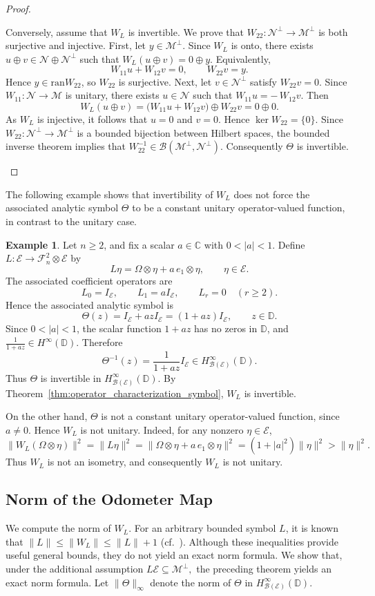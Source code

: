 \documentclass[12pt]{amsart}
\theoremstyle{definition}
\newtheorem{example}[theorem]{Example}
\theoremstyle{remark}
\def \D{\mathbb{D}}
\def \C{\mathbb{C}}
\newcommand{\clb}{\mathcal{B}}
\newcommand{\cle}{\mathcal{E}}
\newcommand{\clm}{\mathcal{M}}
\newcommand{\cln}{\mathcal{N}}
\newcommand{\clf}{\mathcal{F}}
\newcommand{\ran}{\mathrm{ran}}
\numberwithin{equation}{section}
\begin{document}
\begin{proof}
\begin{enumerate}
Conversely, assume that $W_L$ is invertible. We prove that $W_{22}:\cln^{\perp} \to \clm^{\perp}$ is both surjective and injective.
First, let $y\in \clm^\perp$. Since $W_L$ is onto, there exists $u\oplus v\in \cln\oplus \cln^\perp$ such that $W_L(u\oplus v)=0\oplus y.$
Equivalently,
\[
W_{11}u+W_{12}v=0, \qquad W_{22}v=y.
\]
Hence $y\in \ran W_{22}$, so $W_{22}$ is surjective.
Next, let $v\in \cln^\perp$ satisfy $W_{22}v=0$. Since $W_{11}:\cln\to \clm$ is unitary, there exists $u\in \cln$ such that $W_{11}u=-\,W_{12}v.$
Then
\[
W_L(u\oplus v)=\big(W_{11}u+W_{12}v\big)\oplus W_{22}v=0\oplus 0.
\]
As $W_L$ is injective, it follows that $u=0$ and $v=0$. Hence $\ker W_{22}=\{0\}$. Since $W_{22}: \cln^\perp \to \clm^\perp$ is a bounded bijection between Hilbert spaces, the bounded inverse theorem implies that \(W_{22}^{-1}\in \clb(\clm^\perp,\cln^\perp)\).
Consequently $\Theta$ is invertible. 
\end{enumerate}
\end{proof}

The following example shows that invertibility of \(W_L\) does not force the
associated analytic symbol \(\Theta\) to be a constant unitary
operator-valued function, in contrast to the unitary case. 

\begin{example}
 Let \(n\geq2\),
and fix a scalar \(a\in\C\) with \(0<|a|<1\). Define
\(L:\cle\to \clf_n^2\otimes\cle\) by
\[
L\eta=\Omega\otimes\eta+a\,e_1\otimes\eta,
\qquad \eta\in\cle.
\]
The associated coefficient operators are
\[
L_0=I_\cle,\qquad L_1=aI_\cle,\qquad L_r=0\quad(r\geq2).
\]
Hence the associated analytic symbol is
\[
\Theta(z)=I_\cle+azI_\cle=(1+az)I_\cle,\qquad z\in\D.
\]
Since \(0<|a|<1\), the scalar function \(1+az\) has no zeros in \(\D\), and $\frac{1}{1+az}\in H^\infty(\D).$
Therefore
\[
\Theta^{-1}(z)=\frac{1}{1+az}I_\cle \in H^\infty_{\clb(\cle)}(\D).
\]
Thus \(\Theta\) is invertible in
\(H^\infty_{\clb(\cle)}(\D)\). By
Theorem~\ref{thm:operator_characterization_symbol}, \(W_L\) is invertible.

On the other hand, \(\Theta\) is not a constant unitary operator-valued
function, since \(a\neq0\). Hence \(W_L\) is not unitary. Indeed, for any nonzero
\(\eta\in\cle\),
\[
\|W_L(\Omega\otimes\eta)\|^2
=
\|L\eta\|^2
=
\|\Omega\otimes\eta+a\,e_1\otimes\eta\|^2
=
(1+|a|^2)\|\eta\|^2 > \|\eta\|^2.
\]
Thus \(W_L\) is not an isometry, and consequently \(W_L\) is not unitary.
\end{example}

\subsection{Norm of the Odometer Map }
\label{sec:norm_W_L}
We compute the norm of $W_L$. For an arbitrary bounded symbol $L$, it is known that $\|L\| \leq \|W_L\| \leq \|L\|+1$
(cf.~\cite[Remark~2.4]{mansi2025}). Although these inequalities provide useful general bounds, they do not yield an exact norm formula. We show that, under the additional assumption $L\cle \subseteq \clm^\perp,$
the preceding theorem yields an exact norm formula. Let $\|\Theta\|_\infty$ denote the norm of $\Theta$ in $H^\infty_{\clb(\cle)}(\D)$.
\end{document}
